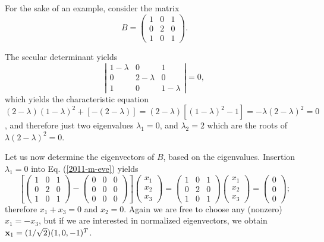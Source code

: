 {\color{blue}
\bexample
For the sake of an example, consider  the
{matrix}
\begin{equation}
B=
\left(
\begin{array}{rrrr}
1&0&1\\
0&2&0\\
1&0&1
\end{array}
\right).
\end{equation}

The secular determinant yields
$$
\left|
\begin{array}{ccccc}
1-\lambda &0&1\\
0&2-\lambda &0\\
1&0&1-\lambda
\end{array}
\right| = 0,
$$
which yields the characteristic equation
$
(2-\lambda )(1-\lambda )^2 +[-(2-\lambda )]=
(2-\lambda )[(1-\lambda )^2 -1]=
-\lambda (2-\lambda )^2 =0$,
and therefore just two  eigenvalues
$\lambda_1=0$,  and
$\lambda_2=2$ which are the roots of $\lambda (2-\lambda )^2 =0$.

Let us now determine the eigenvectors of $B$, based on the eigenvalues.
Insertion  $\lambda_1=0$ into Eq. (\ref{2011-m-eve})  yields
\begin{equation}
\left[
\left(
\begin{array}{rrrr}
1&0&1\\
0&2&0\\
1&0&1
\end{array}
\right)  -
\left(
\begin{array}{rrrr}
0&0&0\\
0&0&0\\
0&0&0
\end{array}
\right)
\right]
\left(
\begin{array}{rrrr}
x_1\\
x_2\\
x_3
\end{array}
\right)
=
\left(
\begin{array}{rrrr}
1&0&1\\
0&2&0\\
1&0&1
\end{array}
\right)
\left(
\begin{array}{rrrr}
x_1\\
x_2\\
x_3
\end{array}
\right)
=
\left(
\begin{array}{rrrr}
0\\
0\\
0
\end{array}
\right)
;
\end{equation}
therefore $x_1+x_3=0$ and $x_2=0$.
Again we are free to choose any (nonzero) $x_1=-x_3$,
but if we are interested in normalized eigenvectors, we obtain
${\bf x}_1 =(1/\sqrt{2})(1,0,-1)^T$.

}
